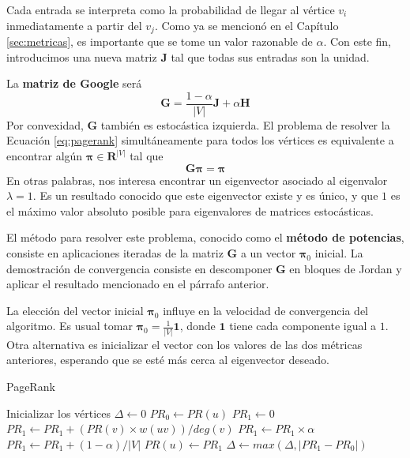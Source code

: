 \documentclass[journal]{IEEEtran}
\let\MYoriglatexcaption\caption
\renewcommand{\caption}[2][\relax]{\MYoriglatexcaption[#2]{#2}}
\newcommand{\matr}[1]{\mathbf{#1}} %
\begin{document}
Cada entrada se interpreta como la probabilidad de llegar al vértice \(v_i\) inmediatamente a partir del \(v_j\). Como ya se mencionó en el Capítulo \ref{sec:metricas}, es importante que se tome un valor razonable de \(\alpha\). Con este fin, introducimos una nueva matriz \(\matr{J}\) tal que todas sus entradas son la unidad.

La \textbf{matriz de Google} será \cite{langville}
\begin{equation}
	\matr{G} = \frac{1-\alpha}{|V|} \matr{J} + \alpha \matr{H}
\end{equation}
Por convexidad, \(\matr{G}\) también es estocástica izquierda. El problema de resolver la Ecuación \ref{eq:pagerank} simultáneamente para todos los vértices es equivalente a encontrar algún \(\bm{\pi} \in \mathbf{R}^{|V|} \) tal que
\begin{equation}
	\matr{G} \bm{\pi} = \bm{\pi}
\end{equation}
En otras palabras, nos interesa encontrar un eigenvector asociado al eigenvalor \(\lambda = 1\). Es un resultado conocido que este eigenvector existe y es único, y que \(1\) es el máximo valor absoluto posible para eigenvalores de matrices estocásticas\cite{meyer}.

El método para resolver este problema, conocido como el \textbf{método de potencias}, consiste en aplicaciones iteradas de la matriz \(\matr{G}\) a un vector \(\bm{\pi}_0\) inicial. La demostración de convergencia consiste en descomponer \(\matr{G}\) en bloques de Jordan y aplicar el resultado mencionado en el párrafo anterior\cite{langville}.

La elección del vector inicial \(\bm{\pi}_0\) influye en la velocidad de convergencia del algoritmo. Es usual tomar \(\bm{\pi}_0 = \frac{1}{|V|} \bm{1} \), donde \(\bm{1}\) tiene cada componente igual a \(1\). Otra alternativa es inicializar el vector con los valores de las dos métricas anteriores, esperando que se esté más cerca al eigenvector deseado.

\begin{algorithm}[H]
	\caption{PageRank} \label{alg:pagerank}
	\begin{algorithmic}
			\State Inicializar los vértices
			\Do
				\State $\Delta \gets 0$
					\State $PR_0 \gets PR(u)$
					\State $PR_1 \gets 0$
						\State $PR_1 \gets PR_1 + (PR(v) \times w(uv))/deg(v)$
					\EndFor
					\State $PR_1 \gets PR_1 \times \alpha$
					\State $PR_1 \gets PR_1 + (1-\alpha)/|V|$
					\State $PR(u) \gets PR_1$
					\State $\Delta \gets max(\Delta, |PR_1 - PR_0|)$
				\EndFor
			\doWhile{$\Delta > \epsilon$}
		\EndFunction
	\end{algorithmic}
\end{algorithm}
\end{document}
